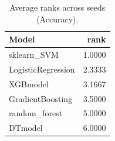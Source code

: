 \begin{table}[t]
\centering
\begin{tabular}{lr}
\toprule
Model & rank \\
\midrule
sklearn_SVM & 1.0000 \\
LogisticRegression & 2.3333 \\
XGBmodel & 3.1667 \\
GradientBoosting & 3.5000 \\
random_forest & 5.0000 \\
DTmodel & 6.0000 \\
\bottomrule
\end{tabular}
\caption{Average ranks across seeds (Accuracy).}
\label{tab:avg_rank_Accuracy}
\end{table}